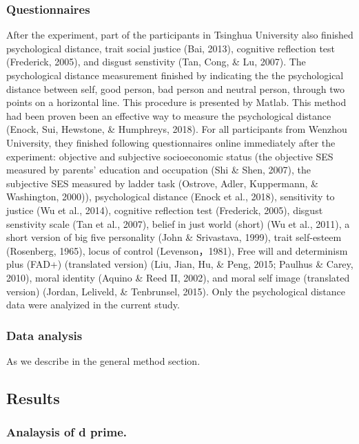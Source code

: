 \documentclass[man]{apa6}
\begin{document}
\hypertarget{questionnaires}{%
\subsubsection{Questionnaires}\label{questionnaires}}

After the experiment, part of the participants in Tsinghua University also finished psychological distance, trait social justice (Bai, 2013), cognitive reflection test (Frederick, 2005), and disgust senstivity (Tan, Cong, \& Lu, 2007). The psychological distance measurement finished by indicating the the psychological distance between self, good person, bad person and neutral person, through two points on a horizontal line. This procedure is presented by Matlab. This method had been proven been an effective way to measure the psychological distance (Enock, Sui, Hewstone, \& Humphreys, 2018).
For all participants from Wenzhou University, they finished following questionnaires online immediately after the experiment: objective and subjective socioeconomic status (the objective SES measured by parents' education and occupation (Shi \& Shen, 2007), the subjective SES measured by ladder task (Ostrove, Adler, Kuppermann, \& Washington, 2000)), psychological distance (Enock et al., 2018), sensitivity to justice (Wu et al., 2014), cognitive reflection test (Frederick, 2005), disgust senstivity scale (Tan et al., 2007), belief in just world (short) (Wu et al., 2011), a short version of big five personality (John \& Srivastava, 1999), trait self-esteem (Rosenberg, 1965), locus of control (Levenson，1981), Free will and determinism plus (FAD+) (translated version) (Liu, Jian, Hu, \& Peng, 2015; Paulhus \& Carey, 2010), moral identity (Aquino \& Reed II, 2002), and moral self image (translated version) (Jordan, Leliveld, \& Tenbrunsel, 2015). Only the psychological distance data were analyized in the current study.

\hypertarget{data-analysis-1}{%
\subsubsection{Data analysis}\label{data-analysis-1}}

As we describe in the general method section.

\hypertarget{results}{%
\subsection{Results}\label{results}}

\hypertarget{analaysis-of-d-prime.}{%
\subsubsection{Analaysis of d prime.}\label{analaysis-of-d-prime.}}
\end{document}

